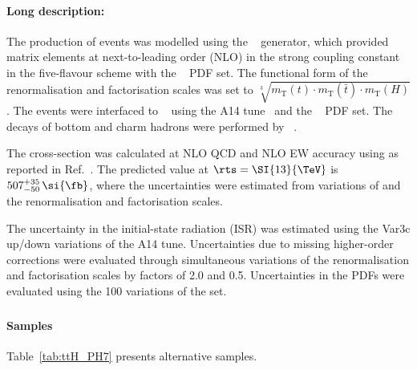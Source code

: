 \paragraph{Long description:}

The production of \ttH events was modelled using the
\POWHEGBOX[v2]~\cite{Frixione:2007nw,Nason:2004rx,Frixione:2007vw,Alioli:2010xd,Hartanto:2015uka}
generator, which provided matrix elements at next-to-leading order (NLO) in the strong coupling 
constant \alphas in the five-flavour scheme with the \NNPDF[3.0nlo]~\cite{Ball:2014uwa} PDF set.
The functional form of the renormalisation and factorisation scales was
set to $\sqrt[3]{m_\text{T}(t)\cdot m_\text{T}(\bar{t}) \cdot m_\text{T}(H)}$.
The events were interfaced to \PYTHIA[8.230]~\cite{Sjostrand:2014zea}
using the A14 tune~\cite{ATL-PHYS-PUB-2014-021} and the
\NNPDF[2.3lo]~\cite{Ball:2014uwa} PDF set. The decays of bottom and charm hadrons
were performed by \EVTGEN[1.6.0]~\cite{Lange:2001uf}.

The cross-section was calculated at NLO QCD and NLO EW accuracy using
\MGNLO as reported in Ref.~\cite{deFlorian:2016spz}.
The predicted value at $\rts = \SI{13}{\TeV}$ is
$507^{+35}_{-50}\,\si{\fb}$, where the uncertainties were estimated from
variations of \alphas and the renormalisation and factorisation scales.

The uncertainty in the initial-state radiation (ISR) was estimated using the Var3c
up/down variations of the A14 tune. Uncertainties due to missing
higher-order corrections were evaluated through simultaneous variations of the
renormalisation and factorisation scales by factors of
2.0 and 0.5. Uncertainties in the PDFs were evaluated using the 100
variations of the \NNPDF[3.0nlo] set.


\subsubsection[Powheg+Herwig7]{\POWHER[7]}

\paragraph{Samples}

Table~\ref{tab:ttH_PH7} presents alternative \ttH samples.

